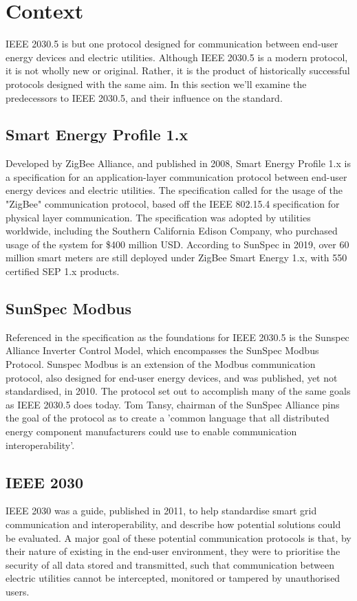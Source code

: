 \chapter{Context}\label{ch:context}

IEEE 2030.5 is but one protocol designed for communication between end-user energy devices and electric utilities. 
Although IEEE 2030.5 is a modern protocol, it is not wholly new or original. Rather, it is the product of historically successful protocols designed with the same aim.
In this section we'll examine the predecessors to IEEE 2030.5, and their influence on the standard.

\section{Smart Energy Profile 1.x}
Developed by ZigBee Alliance, and published in 2008, Smart Energy Profile 1.x is a specification for an application-layer communication protocol between end-user energy devices and electric utilities. 
The specification called for the usage of the "ZigBee" communication protocol, based off the IEEE 802.15.4 specification for physical layer communication. \cite[]{ZigBeeSEP} \hfill \break
The specification was adopted by utilities worldwide, including the Southern California Edison Company, who purchased usage of the system for \$400 million USD. \cite[]{SEP1Article} \hfill \break
According to SunSpec in 2019, over 60 million smart meters are still deployed under ZigBee Smart Energy 1.x, with 550 certified SEP 1.x products. \cite[]{20305workshop}


\section{SunSpec Modbus}
Referenced in the specification as the foundations for IEEE 2030.5 is the Sunspec Alliance Inverter Control Model, which encompasses the SunSpec Modbus Protocol.
Sunspec Modbus is an extension of the Modbus communication protocol, also designed for end-user energy devices, and was published, yet not standardised, in 2010. The protocol set out to accomplish many of the same goals as IEEE 2030.5 does today. 
Tom Tansy, chairman of the SunSpec Alliance pins the goal of the protocol as to create a 'common language that all distributed energy component manufacturers could use to enable communication interoperability'.
\cite[]{SunspecModbusArticle}

\section{IEEE 2030}
IEEE 2030 was a guide, published in 2011, to help standardise smart grid communication and interoperability, and describe how potential solutions could be evaluated. A major goal of these potential communication protocols is that, by their nature of existing in the end-user environment, they were to prioritise the security of all data stored and transmitted, such that communication between electric utilities cannot be intercepted, monitored or tampered by unauthorised users.

